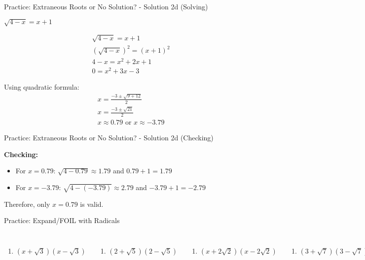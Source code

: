 \documentclass[aspectratio=169]{beamer}
\begin{document}
\begin{frame}{Practice: Extraneous Roots or No Solution? - Solution 2d (Solving)}
\begin{tcolorbox}[colback=lightgray,colframe=primary,title=Solution 2d -- Solving]
\footnotesize
$\sqrt{4-x} = x+1$

\begin{align*}
  &\sqrt{4-x} = x+1 \\
  &(\sqrt{4-x})^2 = (x+1)^2 \\
  &4-x = x^2+2x+1 \\
  &0 = x^2+3x-3
\end{align*}

Using quadratic formula:
\begin{align*}
  &x = \frac{-3 \pm \sqrt{9+12}}{2} \\
  &x = \frac{-3 \pm \sqrt{21}}{2} \\
  &x \approx 0.79 \text{ or } x \approx -3.79
\end{align*}
\end{tcolorbox}
\end{frame}

\begin{frame}{Practice: Extraneous Roots or No Solution? - Solution 2d (Checking)}
\begin{tcolorbox}[colback=lightgray,colframe=primary,title=Solution 2d -- Checking]
\footnotesize
\textbf{Checking:}

\begin{itemize}
  \item For $x = 0.79$: $\sqrt{4-0.79} \approx 1.79$ and $0.79+1 = 1.79$ \checkmark
  \item For $x = -3.79$: $\sqrt{4-(-3.79)} \approx 2.79$ and $-3.79+1 = -2.79$ \texttimes
\end{itemize}
Therefore, only $x = 0.79$ is valid.
\end{tcolorbox}
\end{frame}

\begin{frame}{Practice: Expand/FOIL with Radicals}
\begin{tcolorbox}[colback=lightgray,colframe=accent,title=Practice Problems]
\footnotesize
\begin{columns}[T]
\begin{enumerate}
  \item $(x+\sqrt{3})(x-\sqrt{3})$
\end{enumerate}
\begin{enumerate}
  \item $(2+\sqrt{5})(2-\sqrt{5})$
\end{enumerate}
\begin{enumerate}
  \item $(x+2\sqrt{2})(x-2\sqrt{2})$
\end{enumerate}
\begin{enumerate}
  \item $(3+\sqrt{7})(3-\sqrt{7})$
\end{enumerate}
\end{columns}
\end{tcolorbox}
\end{frame}
\end{document}
